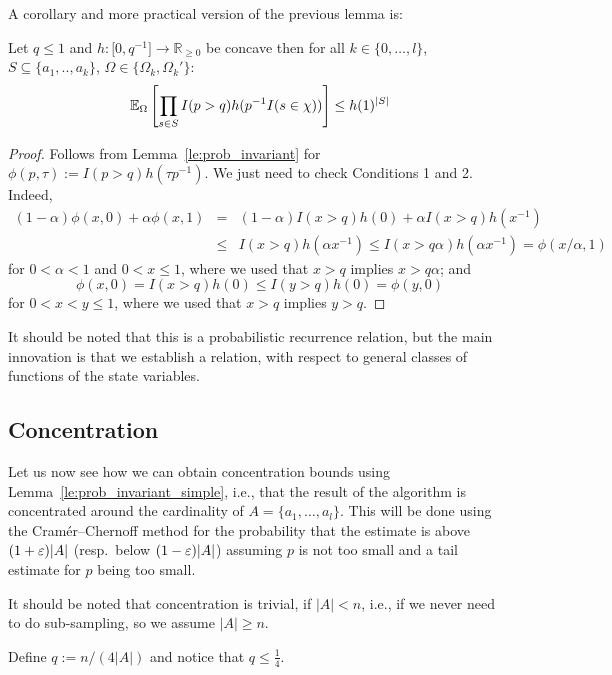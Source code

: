 A corollary and more practical version of the previous lemma is:
\begin{lemma}\label{le:prob_invariant_simple}
Let $q \leq 1$ and $h : \mathbb [0,q^{-1}] \rightarrow \mathbb R_{\geq 0}$ be concave then for all 
$k \in \{0,\ldots,l\}$, $S \subseteq \{a_1,..,a_k\}$, $\Omega \in \{\Omega_k,\Omega_k'\}$:
\[
  \operatorname{\mathbb E}_{\Omega}\left[ \prod_{s \in S} I(p>q) h(p^{-1} I(s \in \chi)) \right] \leq h(1)^{|S|} 
\]
\end{lemma}
\begin{proof}
Follows from Lemma~\ref{le:prob_invariant} for $\phi(p,\tau) := I(p > q) h(\tau p^{-1})$. We just
need to check Conditions 1 and 2. Indeed,
\begin{eqnarray*}
  (1-\alpha) \phi(x,0) + \alpha \phi(x,1) & = & (1-\alpha) I(x>q) h(0) + \alpha I(x>q) h(x^{-1}) \\
   & \leq & I(x > q) h(\alpha x^{-1}) \leq I(x > q \alpha) h(\alpha x^{-1}) = \phi(x/\alpha,1)
\end{eqnarray*}
for $0 < \alpha < 1$ and $0< x \leq 1$, where we used that $x > q$ implies $x > q \alpha$; and
\[
  \phi(x,0) = I(x>q) h(0) \leq I(y > q) h(0) = \phi(y,0)
\]
for $0 < x < y \leq 1$, where we used that $x > q$ implies $y > q$.
\end{proof}

It should be noted that this is a probabilistic recurrence relation, but the main innovation is that
we establish a relation, with respect to general classes of functions of the state variables.

\subsection{Concentration}
Let us now see how we can obtain concentration bounds using Lemma~\ref{le:prob_invariant_simple}, i.e., that
the result of the algorithm is concentrated around the cardinality of $A = \{ a_1, \ldots, a_l \}$.
This will be done using the Cram\'{e}r--Chernoff method for the probability that the estimate is 
above $(1+\varepsilon)|A|$ (resp.~below $(1-\varepsilon)|A|$) assuming $p$ is not too small and a tail estimate 
for $p$ being too small.

It should be noted that concentration is trivial, if $|A| < n$, i.e., if we never need to do
sub-sampling, so we assume $|A| \geq n$.

Define $q := n/(4|A|)$ and notice that $q \leq \frac{1}{4}$.

